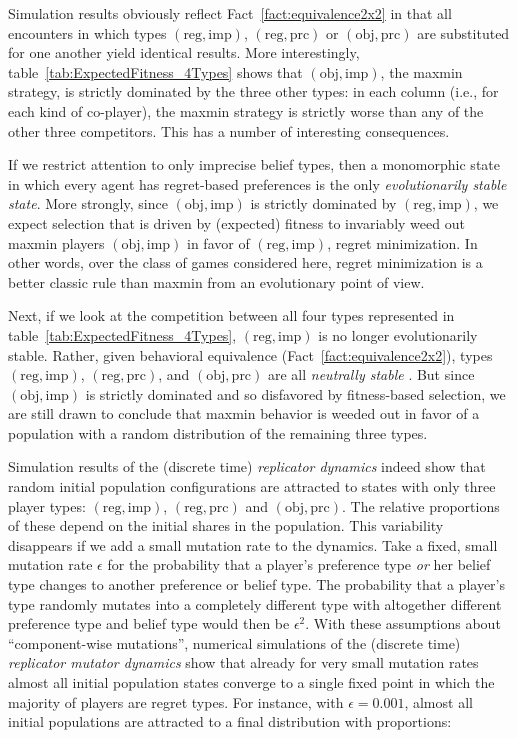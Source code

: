 \documentclass[fleqn,reqno,12pt]{article}
\theoremstyle{Satz}
\theoremstyle{Bsp}
\begin{document}
Simulation results obviously reflect Fact~\ref{fact:equivalence2x2} in that all encounters in
which types $(\text{reg}, \text{imp})$, $(\text{reg}, \text{prc})$ or
$(\text{obj}, \text{prc})$ are substituted for one another yield identical results. More
interestingly, table~\ref{tab:ExpectedFitness_4Types} shows that $(\text{obj}, \text{imp})$,
the maxmin strategy, is strictly dominated by the three other types: in each column (i.e.,
for each kind of co-player), the maxmin strategy is strictly worse than any of the other three
competitors. This has a number of interesting consequences.

If we restrict attention to only imprecise belief types, then a monomorphic state in which every agent has
regret-based preferences is the only \emph{evolutionarily stable state}. More strongly, since
$(\text{obj}, \text{imp})$ is strictly dominated by $(\text{reg}, \text{imp})$, we expect
selection that is driven by (expected) fitness to invariably weed out maxmin players $(\text{obj}, \text{imp})$ in favor of $(\text{reg}, \text{imp})$, regret minimization. 
In other
words, over the class of games considered here, regret
minimization is a better classic rule than maxmin from an evolutionary point of
view.

Next, if we look at the competition between all four types represented in
table~\ref{tab:ExpectedFitness_4Types}, $(\text{reg}, \text{imp})$ is no longer evolutionarily
stable. Rather, given behavioral equivalence (Fact~\ref{fact:equivalence2x2}), types
$(\text{reg}, \text{imp})$, $(\text{reg}, \text{prc})$, and $(\text{obj}, \text{prc})$ are all
\emph{neutrally stable} \citep{Maynard-Smith1982:Evolution-and-t}. But since
$(\text{obj}, \text{imp})$ is strictly dominated and so disfavored by fitness-based selection,
we are still drawn to conclude that maxmin behavior is weeded out in favor of a population with
a random distribution of the remaining three types.

Simulation results of the (discrete time) \emph{replicator dynamics}
\citep{TaylorJonker1978:Evolutionary-St} indeed show that random initial population
configurations are attracted to states with only three player types:
$(\text{reg}, \text{imp})$, $(\text{reg}, \text{prc})$ and $(\text{obj}, \text{prc})$. The
relative proportions of these depend on the initial shares in the population. This variability disappears if
we add a small mutation rate to the dynamics. Take a fixed, small mutation rate $\epsilon$ for
the probability that a player's preference type \emph{or} her belief type changes to another
preference or belief type. The probability that a player's type randomly mutates into a
completely different type with altogether different preference type and belief type would
then be $\epsilon^2$. With these assumptions about ``component-wise mutations'', numerical
simulations of the (discrete time) \emph{replicator mutator dynamics}
\citep{Nowak2006:Evolutionary-Dy} show that already for very small mutation rates almost all
initial population states converge to a single fixed point in which the majority of players are
regret types. For instance, with $\epsilon = 0.001$, almost all initial populations are
attracted to a final distribution with proportions:
\end{document}
